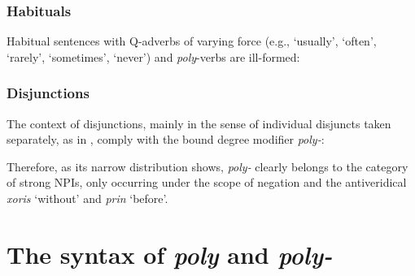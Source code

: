 \documentclass[output=paper]{langscibook}
\begin{document}
\begin{exe}
        \label{gia:ex15}
\end{exe}

\subsubsection{Habituals}

\noindent Habitual sentences with Q-adverbs of varying force (e.g., `usually', `often', `rarely', `sometimes', `never') and \textit{poly}-verbs are ill-formed:

\begin{exe}
        \label{gia:ex16}
\end{exe}

\subsubsection{Disjunctions}

\noindent The context of disjunctions, mainly in the sense of individual disjuncts taken separately, as in , comply with the bound degree modifier \textit{poly-}:

\begin{exe}
        \label{gia:ex17}
\end{exe}

\noindent Therefore, as its narrow distribution shows, \textit{poly-} clearly belongs to the category of strong NPIs, only occurring under the scope of negation and the antiveridical \textit{xoris} ‘without’ and \textit{prin} `before'.


\section{The syntax of \textit{poly} and \textit{poly-}} \label{gia:sec:syntax}
\end{document}
